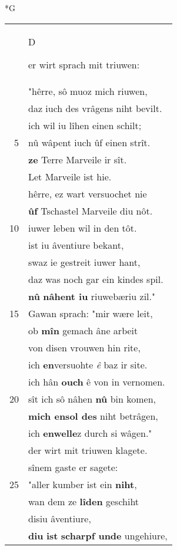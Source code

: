 \documentclass[8pt,a4paper,notitlepage]{article}
\begin{document}
\begin{table}[ht]
\begin{minipage}[t]{0.5\linewidth}
\small
\begin{center}*G
\end{center}
\begin{tabular}{rl}
 & \begin{large}D\end{large}er wirt sprach mit triuwen:\\ 
 & "hêrre, sô muoz mich riuwen,\\ 
 & daz iuch des vrâgens niht bevilt.\\ 
 & ich wil iu lîhen einen schilt;\\ 
5 & nû wâpent iuch ûf einen strît.\\ 
 & \textbf{ze} Terre Marveile ir sît.\\ 
 & Let Marveile ist hie.\\ 
 & hêrre, ez wart versuochet nie\\ 
 & \textbf{ûf} Tschastel Marveile diu nôt.\\ 
10 & iuwer leben wil in den tôt.\\ 
 & ist iu âventiure bekant,\\ 
 & swaz ie gestreit iuwer hant,\\ 
 & daz was noch gar ein kindes spil.\\ 
 & \textbf{nû} \textbf{nâhent iu} riuwebæriu zil."\\ 
15 & Gawan sprach: "mir wære leit,\\ 
 & ob \textbf{mîn} gemach âne arbeit\\ 
 & von disen vrouwen hin rite,\\ 
 & ich \textbf{en}versuohte \textit{ê} baz ir site.\\ 
 & ich hân \textbf{ouch} ê von in vernomen.\\ 
20 & sît ich sô nâhen \textbf{nû} bin komen,\\ 
 & \textbf{mich ensol des} niht betrâgen,\\ 
 & ich \textbf{en}\textbf{welle}z durch si wâgen."\\ 
 & der wirt mit triuwen klagete.\\ 
 & sînem gaste er sagete:\\ 
25 & "aller kumber ist ein \textbf{niht},\\ 
 & wan dem ze \textbf{lîden} geschiht\\ 
 & disiu âventiure,\\ 
 & \textbf{diu} \textbf{ist} \textbf{scharpf unde} ungehiure,\\ 

\end{tabular}
\end{minipage}
\end{table}
\end{document}
